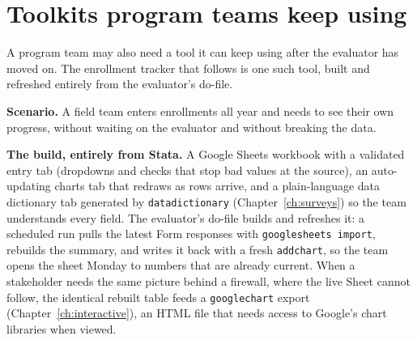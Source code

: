\documentclass[
    a4paper,
    fontsize=10pt,
    twoside=true,
    numbers=noenddot,
]{kaobook}
\newcounter{appliedexample}
\newenvironment{appliedexample}[1][]{%
    \refstepcounter{appliedexample}%
    \begin{appliedexamplebox}[frametitle={Applied Example~\theappliedexample.~~#1}]%
}{%
    \end{appliedexamplebox}%
}
\begin{document}
\section{Toolkits program teams keep using}\label{sec:teamtoolkit}
A program team may also need a tool it can keep using after the evaluator has moved on. The enrollment tracker that follows is one such tool, built and refreshed entirely from the evaluator's do-file.

\begin{appliedexample}[An enrollment tracker the field team keeps]\label{ae:ch11-tracker}
\textbf{Scenario.} A field team enters enrollments all year and needs to see their own progress, without waiting on the evaluator and without breaking the data.

\medskip
\textbf{The build, entirely from Stata.} A Google Sheets workbook with a validated entry tab (dropdowns and checks that stop bad values at the source), an auto-updating charts tab that redraws as rows arrive, and a plain-language data dictionary tab generated by \texttt{datadictionary} (Chapter~\ref{ch:surveys}) so the team understands every field. The evaluator's do-file builds and refreshes it: a scheduled run pulls the latest Form responses with \texttt{googlesheets import}, rebuilds the summary, and writes it back with a fresh \texttt{addchart}, so the team opens the sheet Monday to numbers that are already current. When a stakeholder needs the same picture behind a firewall, where the live Sheet cannot follow, the identical rebuilt table feeds a \texttt{googlechart} export (Chapter~\ref{ch:interactive}), an HTML file that needs access to Google's chart libraries when viewed.


\end{appliedexample}
\end{document}
